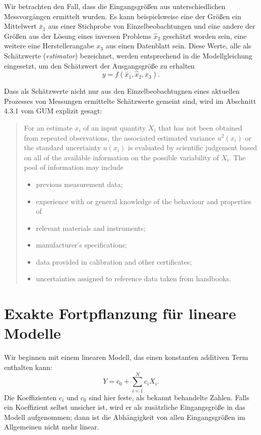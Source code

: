 Wir betrachten den Fall, dass die Eingangsgrößen aus unterschiedlichen Messvorgängen ermittelt wurden. Es kann beispielsweise eine der Größen ein Mittelwert $\bar x_1$ aus einer Stichprobe von Einzelbeobachtungen und eine andere der Größen aus der Lösung eines inversen Problems $\hat x_2$ geschätzt worden sein, eine weitere eine Herstellerangabe $x_3$ aus einen Datenblatt sein. Diese Werte, alle als Schätzwerte (\textsl{estimator}) bezeichnet, werden entsprechend in die Modellgleichung eingesetzt, um den Schätzwert der Ausgangsgröße zu erhalten
$$
y = f(\bar x_1,\hat x_2, x_3).
$$

Dass als Schätzwerte nicht nur aus den Einzelbeobachtugnen eines aktuellen Prozesses von Messungen ermittelte Schätzwerte gemeint sind, wird im Abschnitt 4.3.1 vom GUM explizit gesagt:

\begin{quote}
For an estimate $x_i$ of an input quantity $X_i$ that has not been obtained from repeated observations, the associated estimated variance $u^2(x_i)$ or the standard uncertainty $u(x_i)$ is evaluated by scientific judgement based on all of the available information on the possible variability of $X_i$. The pool of information may include

\begin{itemize}
 \item previous measurement data;
 \item experience with or general knowledge of the behaviour and properties of \item relevant materials and instruments;
 \item manufacturer's specifications;
 \item data provided in calibration and other certificates;
 \item uncertainties assigned to reference data taken from handbooks.
\end{itemize}
\end{quote}

\section{Exakte Fortpflanzung für lineare Modelle}

Wir beginnen mit einem linearen Modell, das einen konstanten
additiven Term enthalten kann:
\begin{equation}
Y=c_0+\sum_{i=1}^N c_i X_i.
\end{equation}
Die Koeffizienten $c_i$ und $c_0$ sind hier feste, als bekannt behandelte
Zahlen. Falls ein Koeffizient selbst unsicher ist, wird er als zusätzliche
Eingangsgröße in das Modell aufgenommen; dann ist die Abhängigkeit von allen
Eingangsgrößen im Allgemeinen nicht mehr linear.

